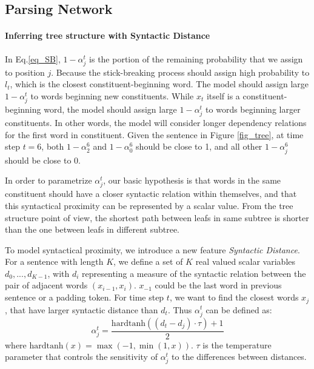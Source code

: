 \documentclass{article} \usepackage{iclr2018_conference,times}
\begin{document}
\subsection{Parsing Network} \label{sec_tree}
\paragraph{Inferring tree structure with Syntactic Distance}
In Eq.\ref{eq_SB}, $1-\alpha_{j}^{t}$ is the portion of the remaining probability that we assign to position $j$. Because the stick-breaking process should assign high probability to $l_t$, which is the closest constituent-beginning word. The model should assign large $1-\alpha_{j}^{t}$ to words beginning new constituents. While $x_t$ itself is a constituent-beginning word, the model should assign large $1-\alpha_{j}^{t}$ to words beginning larger constituents. In other words, the model will consider longer dependency relations for the first word in constituent. Given the sentence in Figure \ref{fig_tree}, at time step $t=6$, both $1-\alpha_{2}^{6}$ and $1-\alpha_{0}^{6}$ should be close to 1, and all other $1-\alpha_{j}^{6}$ should be close to 0. 






In order to parametrize $\alpha_{j}^t$, our basic hypothesis is that words in the same constituent should have a closer syntactic relation within themselves, and that this syntactical proximity can be represented by a scalar value. From the tree structure point of view, the shortest path between leafs in same subtree is shorter than the one between leafs in different subtree. 

To model syntactical proximity, we introduce a new feature \emph{Syntactic Distance}. For a sentence with length $K$, we define a set of $K$ real valued scalar variables $d_0, ..., d_{K-1}$, with $d_i$ representing a measure of the syntactic relation between the pair of adjacent words $(x_{i-1}, x_{i})$. $x_{-1}$ could be the last word in previous sentence or a padding token. For time step $t$, we want to find the closest words $x_{j}$, that have larger syntactic distance than $d_t$. Thus $\alpha_j^t$ can be defined as:
\begin{equation}  \label{soft_alpha}
\alpha_j^t = \frac{\mathrm{hardtanh} \left( (d_t - d_{j}) \cdot \tau \right) + 1}{2} 
\end{equation}
where $\mathrm{hardtanh}(x)=\max(-1, \min(1, x))$. $\tau$ is the temperature parameter that controls the sensitivity of $\alpha_j^t$ to the differences between distances.
\end{document}
